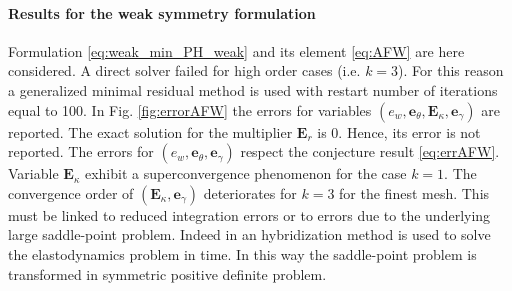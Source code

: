 \documentclass{ifacconf}
\begin{document}
\paragraph{Results for the weak symmetry formulation} 
Formulation \eqref{eq:weak_min_PH_weak} and its element \eqref{eq:AFW} are here considered. A direct solver failed for high order cases (i.e. $k=3$). For this reason a generalized minimal residual method is used with restart number of iterations equal to 100. In Fig. \ref{fig:errorAFW} the errors for variables $(e_w, \bm{e}_\theta, \bm{E}_\kappa, \bm{e}_\gamma)$  are reported. The exact solution for the multiplier $\bm{E}_r$ is 0. Hence, its error is not reported. The errors for $(e_w, \bm{e}_\theta, \bm{e}_\gamma)$ respect the conjecture result \eqref{eq:errAFW}. Variable $\bm{E}_\kappa$ exhibit a superconvergence phenomenon for the case $k=1$. The convergence order of $(\bm{E}_\kappa, \bm{e}_\gamma)$ deteriorates for $k=3$ for the finest mesh. This must be linked to reduced integration errors or to errors due to the underlying large saddle-point problem. Indeed in \cite{ArnoldWeak} an hybridization method is used to solve the elastodynamics problem in time. In this way the saddle-point problem is transformed in symmetric positive definite problem.
\end{document}
